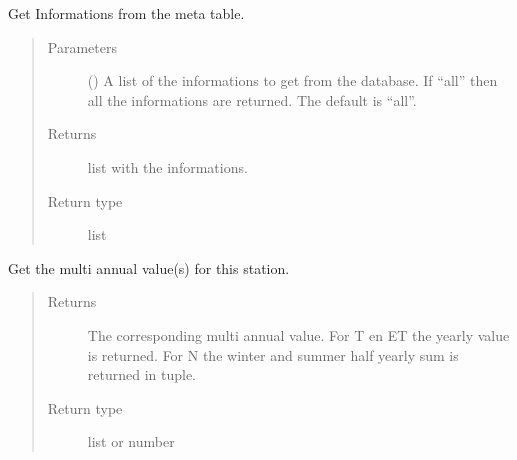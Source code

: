 \documentclass[letterpaper,10pt,english]{sphinxmanual}
\begin{document}
\begin{fulllineitems}
\begin{fulllineitems}
\label{\detokenize{weatherDB:weatherDB.station.StationBase.get_meta}}
\sphinxAtStartPar
Get Informations from the meta table.
\begin{quote}\begin{description}
\item[{Parameters}] \leavevmode
\sphinxAtStartPar
{} (\sphinxstyleliteralemphasis{\sphinxupquote{, }}) \textendash{} A list of the informations to get from the database.
If “all” then all the informations are returned.
The default is “all”.

\item[{Returns}] \leavevmode
\sphinxAtStartPar
list with the informations.

\item[{Return type}] \leavevmode
\sphinxAtStartPar
list

\end{description}\end{quote}

\end{fulllineitems}


\begin{fulllineitems}
\label{\detokenize{weatherDB:weatherDB.station.StationBase.get_multi_annual}}
\sphinxAtStartPar
Get the multi annual value(s) for this station.
\begin{quote}\begin{description}
\item[{Returns}] \leavevmode
\sphinxAtStartPar
The corresponding multi annual value.
For T en ET the yearly value is returned.
For N the winter and summer half yearly sum is returned in tuple.

\item[{Return type}] \leavevmode
\sphinxAtStartPar
list or number


\end{description}
\end{quote}
\end{fulllineitems}
\end{fulllineitems}
\end{document}
